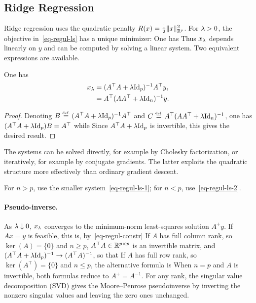 \subsection{Ridge Regression}

Ridge regression uses the quadratic penalty $R(x)=\frac12\lVert x\rVert_{\mathbb{R}^p}^2$. For $\lambda>0$, the objective in~\eqref{eq-regul-ls} has a unique minimizer:
One has 
Thus $x_\lambda$ depends linearly on $y$ and can be computed by solving a linear system. Two equivalent expressions are available.

\begin{prop}
	One has
	\begin{align}
		x_\lambda &= (A^\top A + \lambda \mathrm{Id}_p)^{-1} A^\top y,  \label{eq-regul-ls-1} \\
			 &= A^\top (A A^\top + \lambda \mathrm{Id}_n)^{-1} y. \label{eq-regul-ls-2} 
	\end{align}
\end{prop}

\begin{proof}
	Denoting $B \stackrel{\mbox{\upshape\tiny def.}}{=} (A^\top A + \lambda \mathrm{Id}_p)^{-1} A^\top$ and $C \stackrel{\mbox{\upshape\tiny def.}}{=} A^\top (A A^\top + \lambda \mathrm{Id}_n)^{-1}$, 
	one has $(A^\top A + \lambda \mathrm{Id}_p) B = A^\top$ while 
	Since $A^\top A + \lambda \mathrm{Id}_p$ is invertible, this gives the desired result.
\end{proof}

The systems can be solved directly, for example by Cholesky factorization, or iteratively, for example by conjugate gradients. The latter exploits the quadratic structure more effectively than ordinary gradient descent.

For $n>p$, use the smaller system~\eqref{eq-regul-ls-1}; for $n<p$, use~\eqref{eq-regul-ls-2}.

\paragraph{Pseudo-inverse.}

As $\lambda\downarrow0$, $x_\lambda$ converges to the minimum-norm least-squares solution $A^+y$. If $Ax=y$ is feasible, this is, by~\eqref{eq-regul-constr}
If $A$ has full column rank, so $\ker(A)=\{0\}$ and $n\geq p$, $A^\top A \in \mathbb{R}^{p \times p}$ is an invertible matrix, and $(A^\top A + \lambda \mathrm{Id}_p)^{-1} \rightarrow (A^\top A)^{-1}$, so that
If $A$ has full row rank, so $\ker(A^\top)=\{0\}$ and $n\leq p$, the alternative formula is
When $n=p$ and $A$ is invertible, both formulas reduce to $A^+=A^{-1}$. For any rank, the singular value decomposition (SVD) gives the Moore--Penrose pseudoinverse by inverting the nonzero singular values and leaving the zero ones unchanged.

